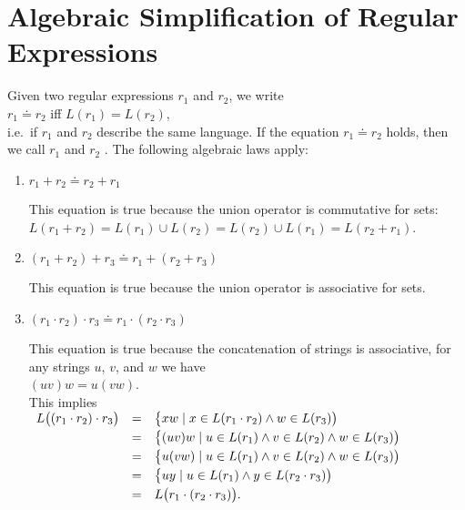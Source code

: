 \section{Algebraic Simplification of Regular Expressions}
Given two regular expressions $r_1$ and $r_2$, we write
\\[0.2cm]
\hspace*{1.3cm}
$r_1 \doteq r_2$ \quad iff \quad $L(r_1) = L(r_2)$,
\\[0.2cm]
i.e.~if $r_1$ and $r_2$ describe the same language.  If the equation $r_1 \doteq r_2$  holds, then we
call $r_1$ and $r_2$ .   The following algebraic laws apply:
\begin{enumerate}
\item $r_1 + r_2 \doteq r_2 + r_1$

      This equation is true because the union operator is commutative for sets:
      \\[0.2cm]
      \hspace*{1.3cm}
      $L(r_1 + r_2) = L(r_1) \cup L(r_2) = L(r_2) \cup L(r_1) = L(r_2 + r_1)$.
\item $(r_1 + r_2) + r_3 \doteq r_1 + (r_2 + r_3)$

      This equation is true because the union operator is associative for sets.
\item $(r_1 \cdot r_2) \cdot r_3 \doteq r_1 \cdot (r_2 \cdot r_3)$

      This equation is true because the concatenation of strings is associative, for any strings
      $u$, $v$, and $w$ we have
      \\[0.2cm]
      \hspace*{1.3cm}
      $(u v) w = u (v w)$.
      \\[0.2cm]
      This implies
      \\[0.2cm]
      \hspace*{1.3cm}
      $
      \begin{array}[t]{lcl}
        L\bigl( (r_1 \cdot r_2) \cdot r_3\bigr) 
        & = & \bigl\{ x w \mid x \in L(r_1 \cdot r_2) \wedge w \in L(r_3)\bigr) \\[0.1cm]
        & = & \bigl\{ (u v) w \mid u \in L(r_1) \wedge v \in L(r_2) \wedge w \in L(r_3)\bigr) \\[0.1cm]
        & = & \bigl\{ u (v w) \mid u \in L(r_1) \wedge v \in L(r_2) \wedge w \in L(r_3)\bigr) \\[0.1cm]
        & = & \bigl\{ u y \mid u \in L(r_1) \wedge y \in L(r_2 \cdot r_3)\bigr) \\[0.1cm]
        & = & L\bigl( r_1 \cdot (r_2 \cdot r_3)\bigr).
      \end{array}
      $


\end{enumerate}
